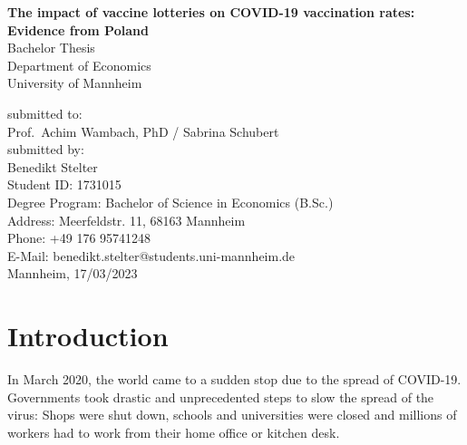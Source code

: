 \documentclass{scrbook}
\begin{document}
	
\frontmatter
\begin{titlepage}

\begin{center}

\vspace*{1,2cm}

\huge {\bfseries The impact of vaccine lotteries on COVID-19 vaccination
rates: Evidence from Poland}\\[1.8cm]

\Large {Bachelor Thesis}\\[1cm]

\large {Department of Economics}\\[0.2cm]

\large {University of Mannheim}\\[0.5cm]

\end{center}

\vfill

\noindent submitted to:\\
Prof.~Achim Wambach, PhD / Sabrina Schubert\\[1cm]
submitted by:\\
Benedikt Stelter\\[1cm]
Student ID: 1731015\\
Degree Program: Bachelor of Science in Economics (B.Sc.)\\[1cm]
Address: Meerfeldstr. 11, 68163 Mannheim\\
Phone: +49 176 95741248\\
E-Mail: benedikt.stelter@students.uni-mannheim.de\\[1cm]
Mannheim, 17/03/2023

\setcounter{page}{0}

\end{titlepage}

  \tableofcontents


\listoffigures

\listoftables


\mainmatter

\chapter{Introduction}

In March 2020, the world came to a sudden stop due to the spread of
COVID-19. Governments took drastic and unprecedented steps to slow the
spread of the virus: Shops were shut down, schools and universities were
closed and millions of workers had to work from their home office or
kitchen desk.
\end{document}
